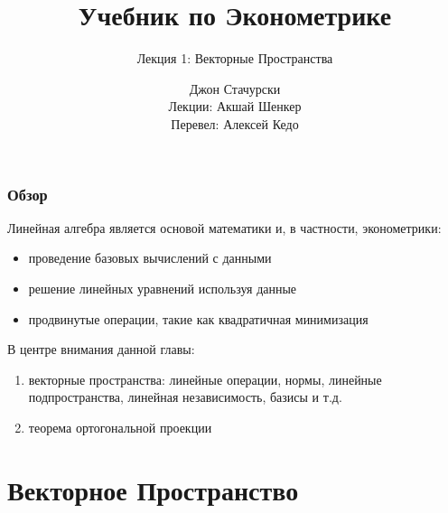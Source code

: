 



\title{Учебник по Эконометрике}

\subtitle
{Лекция 1: Векторные Пространства}


\author{Джон Стачурски \\ \vspace{0.5em} 
	\scriptsize Лекции: Акшай Шенкер \\ \vspace{0.1em} 
	\scriptsize Перевел: Алексей Кедо}



\begin{frame}
  \titlepage
\end{frame}


\begin{frame}

    \frametitle{Обзор}

    \vspace{2em}
    Линейная алгебра является основой математики и, в частности, эконометрики: 
    
    \begin{itemize}
        \item проведение базовых вычислений с данными 
        \item решение линейных уравнений используя данные
        \item продвинутые операции, такие как квадратичная минимизация 
    \end{itemize}
    
    \vspace{1em}
    В центре внимания данной главы:
    \begin{enumerate}
        \item векторные пространства: линейные операции, нормы, линейные подпространства, 
        линейная независимость, базисы и т.д. 
        \item теорема ортогональной проекции 
    \end{enumerate}
 
\end{frame}

\section{Векторное Пространство}

